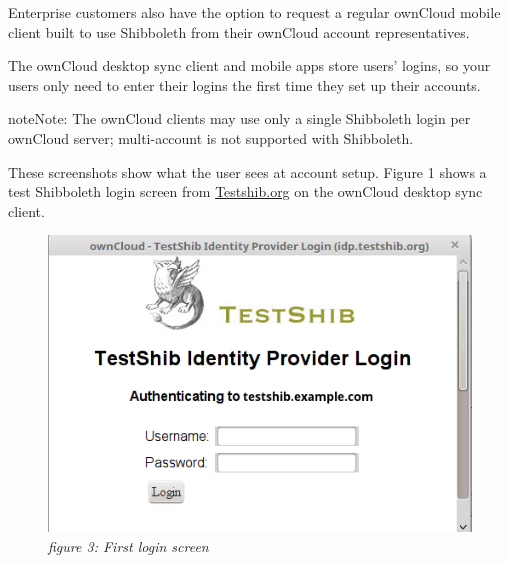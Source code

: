 \documentclass[letterpaper,10pt,english]{sphinxmanual}
\begin{document}
Enterprise customers also have the option to request a regular ownCloud
mobile client built to use Shibboleth from their ownCloud account
representatives.

The ownCloud desktop sync client and mobile apps store users' logins, so
your users only need to enter their logins the first time they set up their
accounts.

\begin{notice}{note}{Note:}
The ownCloud clients may use only a single Shibboleth login per
ownCloud server; multi-account is not supported with Shibboleth.
\end{notice}

These screenshots show what the user sees at account setup. Figure 1
shows a test Shibboleth login screen from
\href{https://www.testshib.org/index.html}{Testshib.org} on the ownCloud desktop
sync client.
\begin{figure}[htbp]
\centering
\capstart

\includegraphics{shib-gui1.png}
\caption{\emph{figure 3: First login screen}}\end{figure}
\end{document}

